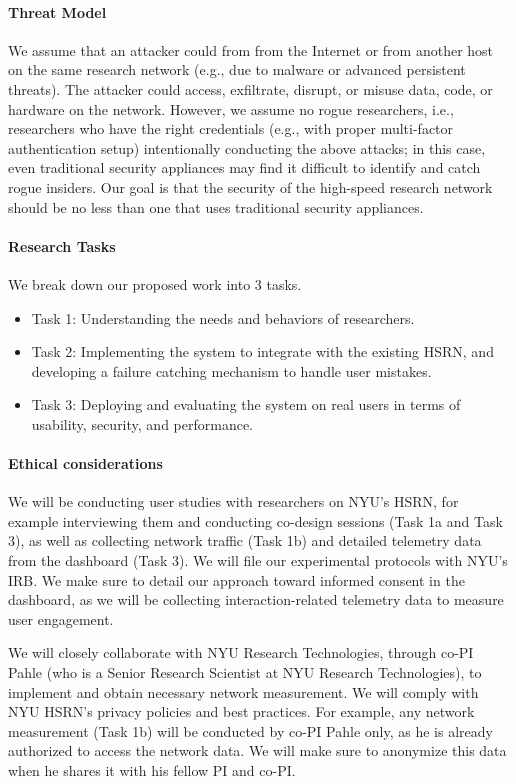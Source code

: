 \paragraph{Threat Model}
We assume that an attacker could from from the Internet or from another host on the same research network (e.g., due to malware or advanced persistent threats). The attacker could access, exfiltrate, disrupt, or misuse data, code, or hardware on the network. However, we assume no rogue researchers, i.e., researchers who have the right credentials (e.g., with proper multi-factor authentication setup) intentionally conducting the above attacks; in this case, even traditional security appliances may find it difficult to identify and catch rogue insiders. Our goal is that the security of the high-speed research network should be no less than one that uses traditional security appliances.


\paragraph{Research Tasks}
We break down our proposed work into 3 tasks.

\begin{itemize}
    \item Task 1: Understanding the needs and behaviors of researchers.
    \item Task 2: Implementing the system to integrate with the existing HSRN, and developing a failure catching mechanism to handle user mistakes.
    \item Task 3: Deploying and evaluating the system on real users in terms of usability, security, and performance.
\end{itemize}



\paragraph{Ethical considerations}
We will be conducting user studies with researchers on NYU's HSRN, for example interviewing them and conducting co-design sessions (Task 1a and Task 3), as well as collecting network traffic (Task 1b) and detailed telemetry data from the dashboard (Task 3). We will file our experimental protocols with NYU's IRB. We make sure to detail our approach toward informed consent in the dashboard, as we will be collecting interaction-related telemetry data to measure user engagement.

We will closely collaborate with NYU Research Technologies, through co-PI Pahle (who is a Senior Research Scientist at NYU Research Technologies), to implement and obtain necessary network measurement. We will comply with NYU HSRN's privacy policies and best practices. For example, any network measurement (Task 1b) will be conducted by co-PI Pahle only, as he is already authorized to access the network data. We will make sure to anonymize this data when he shares it with his fellow PI and co-PI.

